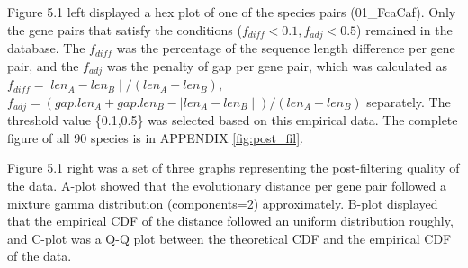 Figure 5.1 left displayed a hex plot of one of the species pairs (01\_FcaCaf). Only the gene pairs that satisfy the conditions ($f_{diff}<0.1, f_{adj}<0.5$) remained in the database. The $f_{diff}$ was the percentage of the sequence length difference per gene pair, and the $f_{adj}$ was the penalty of gap per gene pair, which was calculated as $f_{diff} = \mid len_A-len_B \mid/(len_A+len_B)$,  $f_{adj} = (gap.len_A+gap.len_B - \mid len_A-len_B \mid)/(len_A+len_B) $ separately. The threshold value \{0.1,0.5\} was selected based on this empirical data. The complete figure of all 90 species is in APPENDIX \ref{fig:post_fil}. 

Figure 5.1 right was a set of three graphs representing the post-filtering quality of the data. A-plot showed that the evolutionary distance \parencite{erickson2010jukes} per gene pair followed a mixture gamma distribution (components=2) approximately. B-plot displayed that the empirical CDF of the distance followed an uniform distribution roughly, and C-plot was a Q-Q plot between the theoretical CDF and the empirical CDF of the data. 

